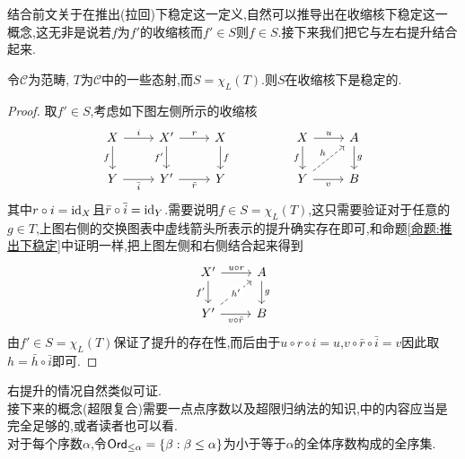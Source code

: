 结合前文关于在推出(拉回)下稳定这一定义,自然可以推导出在收缩核下稳定这一概念,这无非是说若$f$为$f'$的收缩核而$f'\in S$则$f\in S$.接下来我们把它与左右提升结合起来.
\begin{proposition}\label{命题:左提升收缩核稳定}
    令$\mathcal{C}$为范畴, $T$为$\mathcal{C}$中的一些态射,而$S = \chi_L(T)$.则$S$在收缩核下是稳定的.
\end{proposition}
\begin{proof}
    取$f'\in S$,考虑如下图左侧所示的收缩核
    \[\begin{tikzcd}
	X & {X'} & X && X & A \\
	Y & {Y'} & Y && Y & B
	\arrow["i", from=1-1, to=1-2]
	\arrow["f"', from=1-1, to=2-1]
	\arrow["r", from=1-2, to=1-3]
	\arrow["{f'}"', from=1-2, to=2-2]
	\arrow["f", from=1-3, to=2-3]
	\arrow["u", from=1-5, to=1-6]
	\arrow["f"', from=1-5, to=2-5]
	\arrow["g", from=1-6, to=2-6]
	\arrow["{\bar{i}}"', from=2-1, to=2-2]
	\arrow["{\bar{r}}"', from=2-2, to=2-3]
	\arrow["h", dashed, from=2-5, to=1-6]
	\arrow["v"', from=2-5, to=2-6]
    \end{tikzcd}\]
    其中$r\circ i = \mathrm{id}_{X}$且$\bar{r}\circ \bar{i} = \mathrm{id}_{Y}$.需要说明$f\in S = \chi_L(T)$,这只需要验证对于任意的$g\in T$,上图右侧的交换图表中虚线箭头所表示的提升确实存在即可,和命题\ref{命题:推出下稳定}中证明一样,把上图左侧和右侧结合起来得到
    \[\begin{tikzcd}
	{X'} & A \\
	{Y'} & B
	\arrow["{u\circ r}", from=1-1, to=1-2]
	\arrow["{f'}"', from=1-1, to=2-1]
	\arrow["g", from=1-2, to=2-2]
	\arrow["{h'}"{description}, dashed, from=2-1, to=1-2]
	\arrow["{v\circ \bar{r}}"', from=2-1, to=2-2]
    \end{tikzcd}\]
    由$f'\in S = \chi_L(T)$保证了提升的存在性,而后由于$u \circ r \circ i = u$,$v\circ \bar{r} \circ \bar{i} = v$因此取$h = \bar{h}\circ \bar{i}$即可.
\end{proof}
右提升的情况自然类似可证.\\
接下来的概念(超限复合)需要一点点序数以及超限归纳法的知识,\parencite[$\S$1.2-1.3]{李文威卷一}中的内容应当是完全足够的,或者读者也可以看\parencite[\href{https://kerodon.net/tag/03PV}{03PV}]{Kerodon}.\\
对于每个序数$\alpha$,令$\mathsf{Ord}_{\leq \alpha} = \{\beta : \beta \leq \alpha\}$为小于等于$\alpha$的全体序数构成的全序集.
